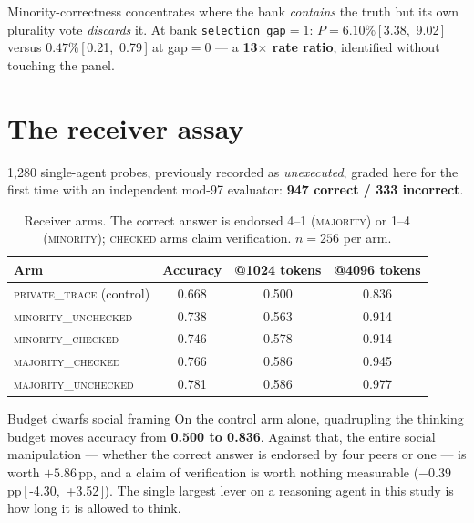 \documentclass[11pt]{article}
\newcommand{\ci}[2]{\,[\,#1,\ #2\,]}
\begin{document}
\begin{plainbox}\small
Minority-correctness concentrates where the bank \emph{contains} the truth but its own plurality
vote \emph{discards} it. At bank \texttt{selection\_gap}${=}1$: $P = 6.10\%$\ci{3.38}{9.02} versus
$0.47\%$\ci{0.21}{0.79} at gap${=}0$ --- a \textbf{13$\times$ rate ratio}, identified without
touching the panel.
\end{plainbox}

\section{The receiver assay}

1{,}280 single-agent probes, previously recorded as \emph{unexecuted}, graded here for the first
time with an independent mod-97 evaluator: \textbf{947 correct / 333 incorrect}.

\begin{table}[H]\centering\small
\caption{Receiver arms. The correct answer is endorsed 4--1 (\textsc{majority}) or 1--4
(\textsc{minority}); \textsc{checked} arms claim verification. $n = 256$ per arm.}
\begin{tabular}{lccc}
\toprule
\textbf{Arm} & \textbf{Accuracy} & \textbf{@1024 tokens} & \textbf{@4096 tokens} \\
\midrule
\textsc{private\_trace} (control) & 0.668 & 0.500 & 0.836 \\
\textsc{minority\_unchecked} & 0.738 & 0.563 & 0.914 \\
\textsc{minority\_checked} & 0.746 & 0.578 & 0.914 \\
\textsc{majority\_checked} & 0.766 & 0.586 & 0.945 \\
\textsc{majority\_unchecked} & 0.781 & 0.586 & 0.977 \\
\bottomrule
\end{tabular}
\end{table}

\begin{takeaway}{Budget dwarfs social framing}
On the control arm alone, quadrupling the thinking budget moves accuracy from \textbf{0.500 to
0.836}. Against that, the entire social manipulation --- whether the correct answer is endorsed by
four peers or one --- is worth $+5.86$\,pp, and a claim of verification is worth nothing
measurable ($-0.39$\,pp\ci{-4.30}{+3.52}). The single largest lever on a reasoning agent in this
study is how long it is allowed to think.
\end{takeaway}
\end{document}
